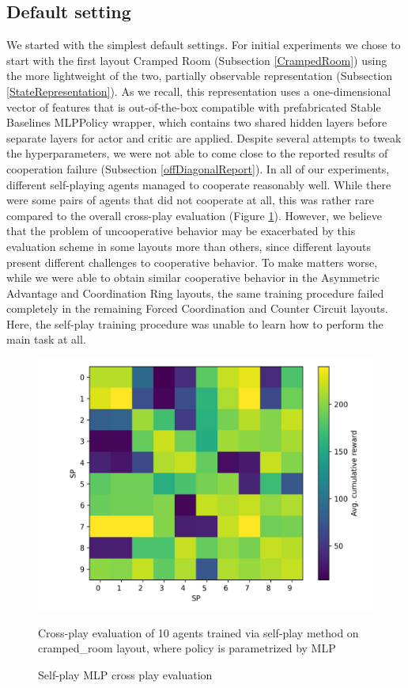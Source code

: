 \subsection*{Default setting}
We started with the simplest default settings.
For initial experiments we chose to start with the first layout Cramped Room (Subsection \ref{CrampedRoom}) using the more lightweight of the two, partially observable representation (Subsection \ref{StateRepresentation}).
As we recall, this representation uses a one-dimensional vector of features that is out-of-the-box compatible with prefabricated Stable Baselines MLPPolicy wrapper, which contains two shared hidden layers before separate layers for actor and critic are applied.
Despite several attempts to tweak the hyperparameters, we were not able to come close to the reported results of cooperation failure (Subsection \ref{offDiagonalReport}).
In all of our experiments, different self-playing agents managed to cooperate reasonably well.
While there were some pairs of agents that did not cooperate at all, this was rather rare compared to the overall cross-play evaluation (Figure \ref{MLPSPCrossPlay}).
However, we believe that the problem of uncooperative behavior may be exacerbated by this evaluation scheme in some layouts more than others, since different layouts present different challenges to cooperative behavior.
To make matters worse, while we were able to obtain similar cooperative behavior in the Asymmetric Advantage and Coordination Ring layouts, the same training procedure failed completely in the remaining Forced Coordination and Counter Circuit layouts.
Here, the self-play training procedure was unable to learn how to perform the main task at all.

\begin{figure}[!ht]
    \centering
    \includegraphics*[width=13cm]{../img/MLP_OFF_DIAG_TEST(3).png}
    \caption{Self-play MLP cross play evaluation}
    \label{MLPSPCrossPlay}
    \medskip
    \small 
    Cross-play evaluation of 10 agents trained via self-play method on cramped\_room layout, where policy is parametrized by MLP

\end{figure}

